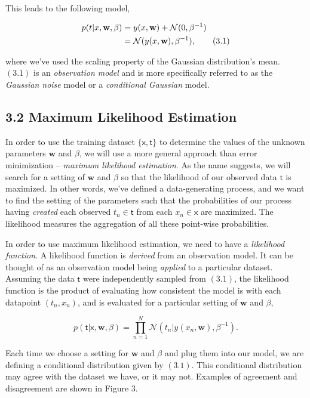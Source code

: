 \documentclass[
  0.875em,
  letterpaper,
  DIV=11,
  numbers=noendperiod]{scrartcl}
\begin{document}
This leads to the following model,

\begin{align}
p(t|x, \mathbf{w}, \beta) &= y(x, \mathbf{w}) + \mathcal{N}(0, \beta^{-1}) \notag \\
&= \mathcal{N}(y(x, \mathbf{w}), \beta^{-1}), \tag{3.1}
\end{align}

where we've used the scaling property of the Gaussian distribution's
mean. \((3.1)\) is an \emph{observation model} and is more specifically
referred to as the \emph{Gaussian noise} model or a \emph{conditional
Gaussian} model.

\hypertarget{maximum-likelihood-estimation}{%
\subsection{3.2 Maximum Likelihood
Estimation}\label{maximum-likelihood-estimation}}

In order to use the training dataset
\(\{\pmb{\mathsf{x}}, \pmb{\mathsf{t}}\}\) to determine the values of
the unknown parameters \(\mathbf{w}\) and \(\beta\), we will use a more
general approach than error minimization -- \emph{maximum likelihood
estimation}. As the name suggests, we will search for a setting of
\(\mathbf{w}\) and \(\beta\) so that the likelihood of our observed data
\(\pmb{\mathsf{t}}\) is maximized. In other words, we've defined a
data-generating process, and we want to find the setting of the
parameters such that the probabilities of our process having
\emph{created} each observed \(t_n \in \pmb{\mathsf{t}}\) from each
\(x_n \in \pmb{\mathsf{x}}\) are maximized. The likelihood measures the
aggregation of all these point-wise probabilities.

In order to use maximum likelihood estimation, we need to have a
\emph{likelihood function}. A likelihood function is \emph{derived} from
an observation model. It can be thought of as an observation model being
\emph{applied} to a particular dataset. Assuming the data
\(\pmb{\mathsf{t}}\) were independently sampled from \((3.1)\), the
likelihood function is the product of evaluating how consistent the
model is with each datapoint \((t_n, x_n)\), and is evaluated for a
particular setting of \(\mathbf{w}\) and \(\beta\),

\[
p(\pmb{\mathsf{t}}| \pmb{\mathsf{x}}, \mathbf{w}, \beta) = \prod_{n=1}^N \mathcal{N}(t_n|y(x_n, \mathbf{w}), \beta^{-1}). \tag{3.2}
\]

Each time we choose a setting for \(\mathbf{w}\) and \(\beta\) and plug
them into our model, we are defining a conditional distribution given by
\((3.1)\). This conditional distribution may agree with the dataset we
have, or it may not. Examples of agreement and disagreement are shown in
Figure 3.
\end{document}

